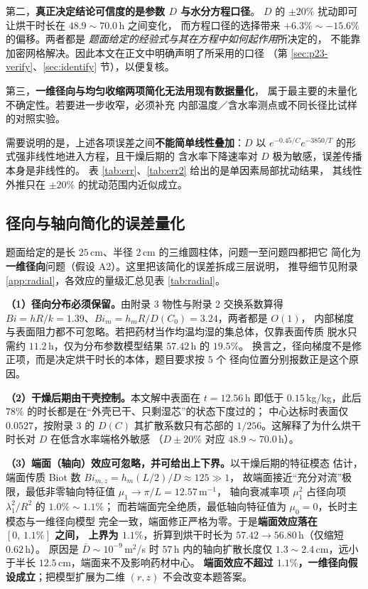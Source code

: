 \documentclass[12pt,a4paper,fontset=none]{ctexart}
\begin{document}
第二，\textbf{真正决定结论可信度的是参数 $D$ 与水分方程口径}。
$D$ 的 $\pm20\%$ 扰动即可让烘干时长在 $48.9\sim70.0$\,h 之间变化，
而方程口径的选择带来 $+6.3\%\sim-15.6\%$ 的偏移。两者都是
\emph{题面给定的经验式与其在方程中如何起作用}所决定的，
不能靠加密网格解决。因此本文在正文中明确声明了所采用的口径
（第 \ref{sec:p23-verify}、\ref{sec:identify} 节），以便复核。

第三，\textbf{一维径向与均匀收缩两项简化无法用现有数据量化}，
属于最主要的未量化不确定性。若要进一步收窄，必须补充
内部温度／含水率测点或不同长径比试样的对照实验。

需要说明的是，上述各项误差之间\textbf{不能简单线性叠加}：$D$ 以
$e^{-0.45/C}e^{-3850/T}$ 的形式强非线性地进入方程，且干燥后期的
含水率下降速率对 $D$ 极为敏感，误差传播本身是非线性的。
表 \ref{tab:err}、\ref{tab:err2} 给出的是单因素局部扰动结果，
其线性外推只在 $\pm20\%$ 的扰动范围内近似成立。

\subsection{径向与轴向简化的误差量化}
\label{sec:radial}

题面给定的是长 $25$\,cm、半径 $2$\,cm 的三维圆柱体，问题一至问题四都把它
简化为\textbf{一维径向}问题（假设 A2）。这里把该简化的误差拆成三层说明，
推导细节见附录 \ref{app:radial}，各效应的量级汇总见表 \ref{tab:radial}。

\textbf{（1）径向分布必须保留。}由附录 3 物性与附录 2 交换系数算得
$Bi=hR/k=1.39$、$Bi_m=h_mR/D(C_0)=3.24$，两者都是 $O(1)$，
内部梯度与表面阻力都不可忽略。若把药材当作均温均湿的集总体，仅靠表面传质
脱水只需约 $11.2$\,h，仅为分布参数模型结果 $57.42$\,h 的 $19.5\%$。
换言之，径向梯度不是修正项，而是决定烘干时长的本体，题目要求按 $5$ 个
径向位置分别报数正是这个原因。

\textbf{（2）干燥后期由干壳控制。}本文解中表面在 $t=12.56$\,h 即低于
$0.15$\,kg/kg，此后 $78\%$ 的时长都是在“外壳已干、只剩湿芯”的状态下度过的；
中心达标时表面仅 $0.0527$，按附录 3 的 $D(C)$ 其扩散系数只有芯部的
$1/256$。这解释了为什么烘干时长对 $D$ 在低含水率端格外敏感
（$D\pm20\%$ 对应 $48.9\sim70.0$\,h）。

\textbf{（3）端面（轴向）效应可忽略，并可给出上下界。}以干燥后期的特征模态
估计，端面传质 Biot 数 $Bi_{m,z}=h_m(L/2)/D\approx125\gg1$，
故端面接近“充分对流”极限，最低非零轴向特征值 $\mu_1\to\pi/L=12.57$\,m$^{-1}$，
轴向衰减率项 $\mu_1^2$ 占径向项 $\lambda_1^2/R^2$ 的 $1.0\%\sim1.1\%$；
而若端面完全绝质，最低轴向特征值为 $\mu_0=0$，长时主模态与一维径向模型
完全一致，端面修正严格为零。于是\textbf{端面效应落在 $[0,\,1.1\%]$ 之间，
上界为 $1.1\%$}，折算到烘干时长为 $57.42\to56.80$\,h（仅缩短 $0.62$\,h）。
原因是 $\bar D\sim10^{-9}$\,m$^2$/s 时 $57$\,h 内的轴向扩散长度仅
$1.3\sim2.4$\,cm，远小于半长 $12.5$\,cm，端面来不及影响药材中心。
\textbf{端面效应不超过 $1.1\%$，一维径向假设成立}；把模型扩展为二维 $(r,z)$
不会改变本题答案。
\end{document}
